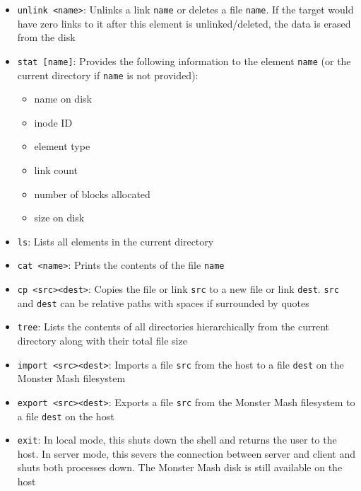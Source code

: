 \documentclass[]{article}
\begin{document}
\begin{itemize}
	\item \texttt{unlink \textless name\textgreater}: Unlinks a link \texttt{name} or deletes a file \texttt{name}. If the target would have zero links to it after this element is unlinked/deleted, the data is erased from the disk
	
	\item \texttt{stat [name]}: Provides the following information to the element \texttt{name} (or the current directory if \texttt{name} is not provided):
	\begin{itemize}
	\item name on disk
	\item inode ID
	\item element type
	\item link count
	\item number of blocks allocated
	\item size on disk
	\end{itemize}
	
	\item \texttt{ls}: Lists all elements in the current directory
	
	\item \texttt{cat \textless name\textgreater}: Prints the contents of the file \texttt{name}
	
	\item \texttt{cp \textless src\textgreater \space \textless dest\textgreater}: Copies the file or link \texttt{src} to a new file or link \texttt{dest}. \texttt{src} and \texttt{dest} can be relative paths with spaces if surrounded by quotes
	
	\item \texttt{tree}: Lists the contents of all directories hierarchically from the current directory along with their total file size
	
	\item \texttt{import \textless src\textgreater \space \textless dest\textgreater}: Imports a file \texttt{src} from the host to a file \texttt{dest} on the Monster Mash filesystem
	
	\item \texttt{export \textless src\textgreater \space \textless dest\textgreater}: Exports a file \texttt{src} from the Monster Mash filesystem to a file \texttt{dest} on the host
	
	\item \texttt{exit}: In local mode, this shuts down the shell and returns the user to the host. In server mode, this severs the connection between server and client and shuts both processes down. The Monster Mash disk is still available on the host
\end{itemize}
\end{document}
